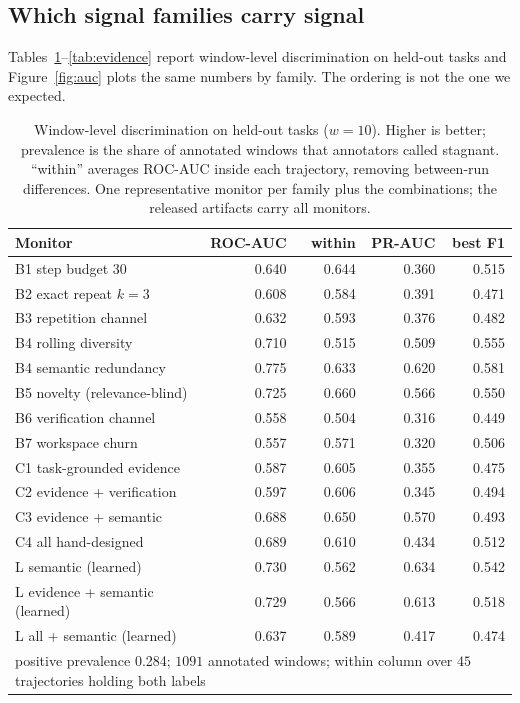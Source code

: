 \subsection{Which signal families carry signal}
Tables~\ref{tab:window}--\ref{tab:evidence} report window-level discrimination on held-out tasks and
Figure~\ref{fig:auc} plots the same numbers by family. The ordering is not the one we expected.

\begin{table}[t]\centering\small
\setlength{\tabcolsep}{4.5pt}
\caption{Window-level discrimination on held-out tasks ($w=10$). Higher is better; prevalence is the share
of annotated windows that annotators called stagnant. ``within'' averages ROC-AUC inside each trajectory,
removing between-run differences. One representative monitor per family plus the combinations; the released
artifacts carry all \pnMonitors{} monitors.}
\label{tab:window}
\begin{tabular}{lrrrr}
\toprule
Monitor & ROC-AUC & within & PR-AUC & best F1 \\
\midrule
B1 step budget 30 & 0.640 & 0.644 & 0.360 & 0.515 \\
B2 exact repeat $k{=}3$ & 0.608 & 0.584 & 0.391 & 0.471 \\
B3 repetition channel & 0.632 & 0.593 & 0.376 & 0.482 \\
B4 rolling diversity & 0.710 & 0.515 & 0.509 & 0.555 \\
B4 semantic redundancy & 0.775 & 0.633 & 0.620 & 0.581 \\
B5 novelty (relevance-blind) & 0.725 & 0.660 & 0.566 & 0.550 \\
B6 verification channel & 0.558 & 0.504 & 0.316 & 0.449 \\
B7 workspace churn & 0.557 & 0.571 & 0.320 & 0.506 \\
C1 task-grounded evidence & 0.587 & 0.605 & 0.355 & 0.475 \\
C2 evidence + verification & 0.597 & 0.606 & 0.345 & 0.494 \\
C3 evidence + semantic & 0.688 & 0.650 & 0.570 & 0.493 \\
C4 all hand-designed & 0.689 & 0.610 & 0.434 & 0.512 \\
L semantic (learned) & 0.730 & 0.562 & 0.634 & 0.542 \\
L evidence + semantic (learned) & 0.729 & 0.566 & 0.613 & 0.518 \\
L all + semantic (learned) & 0.637 & 0.589 & 0.417 & 0.474 \\
\midrule
\multicolumn{5}{l}{positive prevalence 0.284; $1091$ annotated windows; within column over $45$
trajectories holding both labels} \\
\bottomrule\end{tabular}\end{table}

